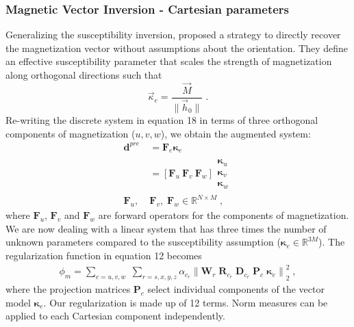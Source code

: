 \documentclass[paper]{geophysics}
\begin{document}
\subsubsection{Magnetic Vector Inversion - Cartesian parameters}
Generalizing the susceptibility inversion, \cite{LelievreOldenburg2009}
proposed a strategy to directly recover the magnetization vector without assumptions about the orientation. They define an effective susceptibility parameter that scales the strength of magnetization along orthogonal directions such that
\begin{equation}
\vec \kappa_e = \frac{\vec{M}}{\|\vec{h}_0\|} \;.
\end{equation}
Re-writing the discrete system in equation 18 in terms of three orthogonal components of magnetization ($u, v, w$), we obtain the augmented system:
\begin{equation}\label{MVIlinear}
\begin{split}
\mathbf{d}^{pre} &= \mathbf{F}_{e} \boldsymbol{\kappa}_e \\
&= [ \mathbf{F}_u \: \mathbf{F}_v \: \mathbf{F}_w]
\begin{matrix}
\boldsymbol{\kappa}_{u}\\
\boldsymbol{\kappa}_{v}\\
\boldsymbol{\kappa}_{w}
\end{matrix} \\
\mathbf{F}_u,\; &\mathbf{F}_v, \;\mathbf{F}_w \in \mathbb{R}^{N \times M} \;,
\end{split}
\end{equation}
where $\mathbf{F}_u$, $\mathbf{F}_v$ and $\mathbf{F}_w$ are forward operators for the components of magnetization.
We are now dealing with a linear system that has three times the number of unknown parameters compared to the susceptibility assumption ($\boldsymbol{\kappa}_e \in \mathbb{R}^{3M}$). The regularization function in equation 12 becomes
\begin{equation} \label{phi_m_sparse_3C}
\begin{split}
\phi_m = \sum_{c = u,v,w} \;
\sum_{r = s,x,y,z} \alpha_{c_r} {\|\mathbf{W}_r \;\mathbf{R}_{c_r} \; \mathbf{D}_{c_r} \;\mathbf{P}_{c} \; \boldsymbol{\kappa}_e\|}^2_2 \;,
\end{split}
\end{equation}
where the projection matrices $\mathbf{P}_{c}$ select individual components of the vector model $\boldsymbol{\kappa}_e$. Our regularization is made up of 12 terms. Norm measures can be applied to each Cartesian component independently.
\end{document}
